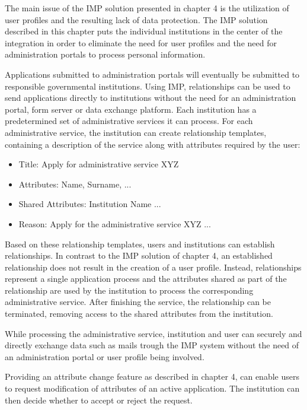 The main issue of the IMP solution presented in chapter 4 is the utilization of user profiles and the resulting lack of data protection. The IMP solution described in this chapter puts the individual institutions in the center of the integration in order to eliminate the need for user profiles and the need for administration portals to process personal information.

Applications submitted to administration portals will eventually be submitted to responsible governmental institutions. Using IMP, relationships can be used to send applications directly to institutions without the need for an administration portal, form server or data exchange platform. Each institution has a predetermined set of administrative services it can process. For each administrative service, the institution can create relationship templates, containing a description of the service along with attributes required by the user:

\begin{itemize}
    \item Title: Apply for administrative service XYZ
    \item Attributes: Name, Surname, ... 
    \item Shared Attributes: Institution Name ...
    \item Reason: Apply for the administrative service XYZ ...
\end{itemize}

Based on these relationship templates, users and institutions can establish relationships. In contrast to the IMP solution of chapter 4, an established relationship does not result in the creation of a user profile. Instead, relationships represent a single application process and the attributes shared as part of the relationship are used by the institution to process the corresponding administrative service. After finishing the service, the relationship can be terminated, removing access to the shared attributes from the institution. 

While processing the administrative service, institution and user can securely and directly exchange data such as mails trough the IMP system without the need of an administration portal or user profile being involved.

Providing an attribute change feature as described in chapter 4, can enable users to request modification of attributes of an active application. The institution can then decide whether to accept or reject the request.

